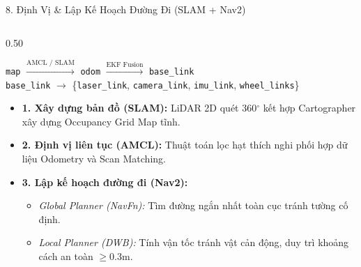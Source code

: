 \documentclass[aspectratio=169,9pt]{beamer}
\newcommand{\smallnote}[1]{{\fontsize{7.1}{8.4}\selectfont #1\par}}
\newcommand{\tinytext}[1]{{\fontsize{6.3}{7.3}\selectfont #1\par}}
\newcommand{\tightitems}{\setlength{\itemsep}{0.13em}\setlength{\parskip}{0pt}\setlength{\parsep}{0pt}}
\newcommand{\verytightitems}{\setlength{\itemsep}{0.04em}\setlength{\parskip}{0pt}\setlength{\parsep}{0pt}}
\begin{document}
\begin{frame}{8. Định Vị \& Lập Kế Hoạch Đường Đi (SLAM + Nav2)}
  \vspace{0.02cm}
  \begin{columns}[T,onlytextwidth]
    \begin{column}{0.50\textwidth}
      \begin{tcolorbox}[titlepanel,title=Cấu trúc cây biến đổi tọa độ (TF Tree)]
        \centering\fontsize{7.6}{9.0}\selectfont
        \texttt{map} $\xrightarrow{\text{AMCL / SLAM}}$ \texttt{odom} $\xrightarrow{\text{EKF Fusion}}$ \texttt{base\_link}\\
        \vspace{0.02cm}
        \texttt{base\_link} $\longrightarrow$ \{\texttt{laser\_link}, \texttt{camera\_link}, \texttt{imu\_link}, \texttt{wheel\_links}\}
      \end{tcolorbox}
      \vspace{0.06cm}
      \begin{tcolorbox}[titlepanel,title=Quy trình điều hướng 3 cấp độ]
        \begin{itemize}\tightitems
          \item \smallnote{\textbf{1. Xây dựng bản đồ (SLAM):} LiDAR 2D quét 360$^\circ$ kết hợp Cartographer xây dựng Occupancy Grid Map tĩnh.}
          \item \smallnote{\textbf{2. Định vị liên tục (AMCL):} Thuật toán lọc hạt thích nghi phối hợp dữ liệu Odometry và Scan Matching.}
          \item \smallnote{\textbf{3. Lập kế hoạch đường đi (Nav2):}
            \begin{itemize}\verytightitems
              \item \tinytext{\textit{Global Planner (NavFn):} Tìm đường ngắn nhất toàn cục tránh tường cố định.}
              \item \tinytext{\textit{Local Planner (DWB):} Tính vận tốc tránh vật cản động, duy trì khoảng cách an toàn $\ge 0.3\text{m}$.}
            \end{itemize}}
        \end{itemize}
      \end{tcolorbox}
    \end{column}


\end{columns}
\end{frame}
\end{document}
